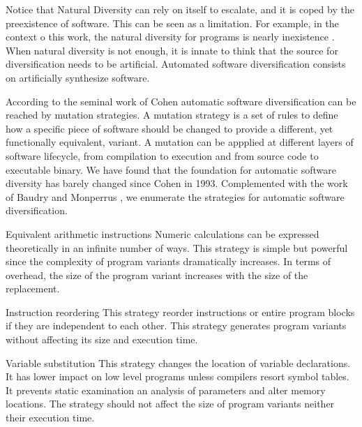 Notice that Natural Diversity can rely on itself to escalate, and it is coped by the preexistence of software. This can be seen as a limitation. For example, in the context o this work, the natural diversity for \wasm programs is nearly inexistence \cite{Hilbig2021AnES}. When natural diversity is not enough, it is innate to think that the source for diversification needs to be artificial. Automated software diversification consists on artificially synthesize software.

According to the seminal work of Cohen \etal \cite{cohen1993operating} automatic software diversification can be reached by mutation strategies. A mutation strategy is a set of rules to define how a specific piece of software should be changed to provide a different, yet functionally equivalent, variant. A mutation can be appplied at different layers of software lifecycle, from compilation to execution and from source code to executable binary. We have found that the foundation for automatic software diversity has barely changed since Cohen in 1993. Complemented with the work of Baudry and Monperrus \cite{natural_diversity}, we enumerate the strategies for automatic software diversification. 

\begin{strategy}{Equivalent arithmetic instructions}
    \label{strategy:S1}
    \normalfont
    Numeric calculations can be expressed theoretically in an infinite number of ways. This strategy is simple but powerful since the complexity of program variants dramatically increases. In terms of overhead, the size of the program variant increases with the size of the replacement. 
    
\end{strategy}


\begin{strategy}{Instruction reordering}
    \label{strategy:S2}
    \normalfont
    This strategy reorder instructions or entire program blocks if they are independent to each other. This strategy generates program variants without affecting its size and execution time. 

\end{strategy}

\begin{strategy}{Variable substitution}
    \label{strategy:S3}
    \normalfont
    This strategy changes the location of variable declarations. It has lower impact on low level programs unless compilers resort symbol tables. It prevents static examination an analysis of parameters and alter memory locations. The strategy should not affect the size of program variants neither their execution time.
\end{strategy}


